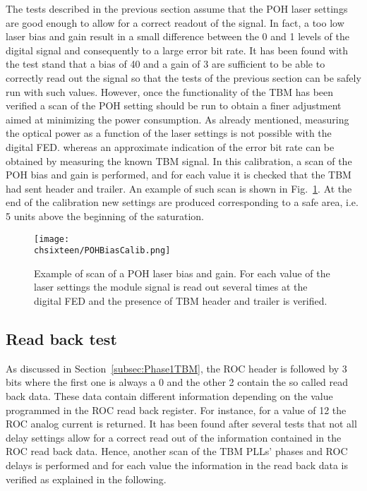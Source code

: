 The tests described in the previous section assume that the POH laser settings are good enough to allow for a correct readout of the signal.
In fact, a too low laser bias and gain result in a small difference between the 0 and 1 levels of the digital signal and consequently to a large error bit rate.
It has been found with the test stand that a bias of 40 and a gain of 3 are sufficient to be able to correctly read out the signal so that the tests of the previous section can be safely run with such values.
However, once the functionality of the TBM has been verified a scan of the POH setting should be run to obtain a finer adjustment aimed at minimizing the power consumption.
As already mentioned, measuring the optical power as a function of the laser settings is not possible with the digital FED.
whereas an approximate indication of the error bit rate can be obtained by measuring the known TBM signal.
In this calibration, a scan of the POH bias and gain is performed, and for each value it is checked that the TBM had sent header and trailer. An example of such scan is shown in Fig.~\ref{fig:POHBiasCalib}.
At the end of the calibration new settings are produced corresponding to a safe area, i.e. 5 units above the beginning of the saturation.

\begin{figure}[!htb]
 \begin{center}
  \texttt{[image: \\chsixteen/POHBiasCalib.png]}
 \end{center}
 \caption{Example of scan of a POH laser bias and gain. For each value of the laser settings the module signal is read out several times at the digital FED and the presence of TBM header and trailer is verified.}
 \label{fig:POHBiasCalib}
\end{figure} 

\subsection{Read back test}

As discussed in Section~\ref{subsec:Phase1TBM}, the ROC header is followed by 3 bits where the first one is always a 0 and the other 2 contain the so called read back data.
These data contain different information depending on the value programmed in the ROC read back register. For instance, for a value of 12 the ROC analog current is returned.
It has been found after several tests that not all delay settings allow for a correct read out of the information contained in the ROC read back data.
Hence, another scan of the TBM PLLs' phases and ROC delays is performed and for each value the information in the read back data is verified as explained in the following.

